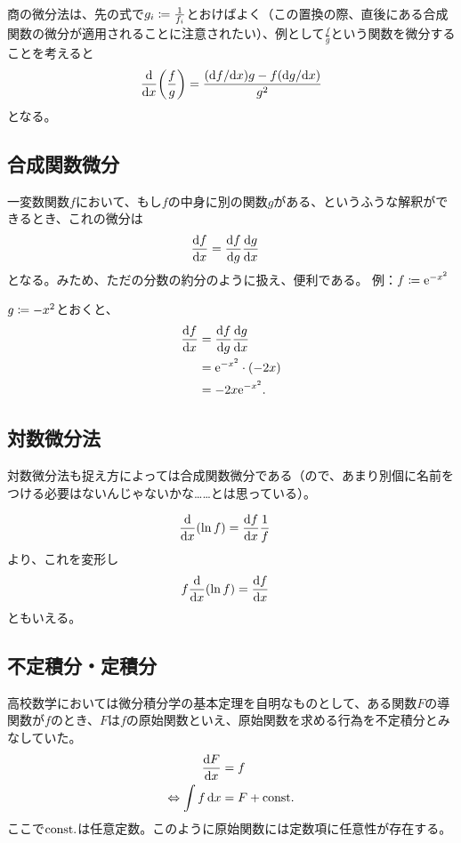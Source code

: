 商の微分法は、先の式で$g_i\coloneqq\frac{1}{f_i}$とおけばよく（この置換の際、直後にある合成関数の微分が適用されることに注意されたい）、例として$\frac{f}g$という関数を微分することを考えると
\begin{align*}
    \opdiff{x}\pare{\frac{f}g}=\frac{\pare{\df/\dx}g-f\pare{\dg/\dx}}{g^2}
\end{align*}
となる。

\subsection{合成関数微分}
一変数関数$f$において、もし$f$の中身に別の関数$g$がある、というふうな解釈ができるとき、これの微分は
\begin{align}
    \frac{\mathrm{d}f}{\mathrm{d}x} & =\frac{\mathrm{d}f}{\mathrm{d}g}\frac{\mathrm{d}g}{\mathrm{d}x}\label{eq:1.4}
\end{align}
となる。みため、ただの分数の約分のように扱え、便利である。
\baselineskip
例：$f\coloneqq\mathrm{e}^{-x^2}$

$g\coloneqq-x^2$とおくと、
\begin{align*}
    \diff{f}{x} & =\diff{f}{g}\diff{g}{x}           \\
                & =\mathrm{e}^{-x^2}\cdot\pare{-2x} \\
                & =-2x\mathrm{e}^{-x^2}.
\end{align*}
\subsection{対数微分法}
対数微分法も捉え方によっては合成関数微分である（ので、あまり別個に名前をつける必要はないんじゃないかな……とは思っている）。

\begin{align*}
    \opdiff{x}\pare{\ln f} & =\diff{f}x\frac1{f}
\end{align*}
より、これを変形し
\begin{align}
    f\opdiff{x}\pare{\ln f} & =\diff{f}{x}
\end{align}
ともいえる。

\subsection{不定積分・定積分}
高校数学においては微分積分学の基本定理を自明なものとして、ある関数$F$の導関数が$f$のとき、$F$は$f$の原始関数といえ、原始関数を求める行為を不定積分とみなしていた。
\begin{align}
    \begin{aligned}
        \frac{\mathrm{d}F}{\mathrm{d}x}                 & =f        \\
        \Leftrightarrow \int f\,\mathrm{d}x & =F+\mathrm{const.}
    \end{aligned}\label{eq:1.5}
\end{align}
ここで$\mathrm{const.}$は任意定数。このように原始関数には定数項に任意性が存在する。

